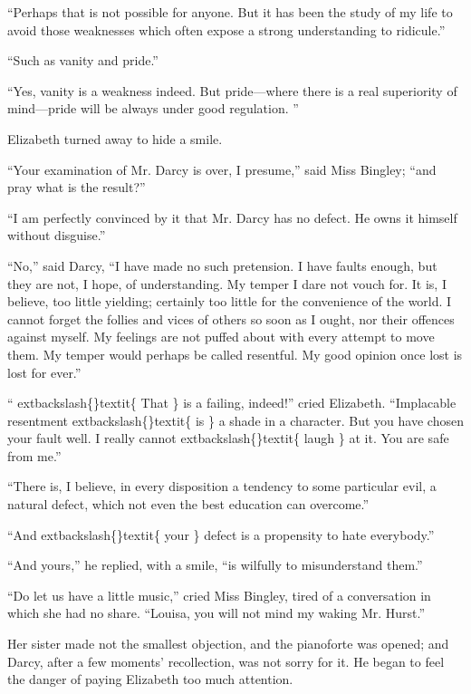 \documentclass[10pt]{book}
\begin{document}
   “Perhaps that is not possible for anyone. But it has been the study of
my life to avoid those weaknesses which often expose a strong
understanding to ridicule.”
  

   “Such as vanity and pride.”
  

   “Yes, vanity is a weakness indeed. But pride—where there is a real
superiority of mind—pride will be always under good regulation.
   ”
  

   Elizabeth turned away to hide a smile.
  

   “Your examination of Mr. Darcy is over, I presume,” said Miss Bingley;
“and pray what is the result?”
  

   “I am perfectly convinced by it that Mr. Darcy has no defect. He owns it
himself without disguise.”
  

   “No,” said Darcy, “I have made no such pretension. I have faults enough,
but they are not, I hope, of understanding. My temper I dare not vouch
for. It is, I believe, too little yielding; certainly too little for the
convenience of the world. I cannot forget the follies and vices of
others so soon as I ought, nor their offences against myself. My
feelings are not puffed about with every attempt to move them. My temper
would perhaps be called resentful. My good opinion once lost is lost for
ever.”
  

   “
   	extbackslash\{\}textit\{
    That
   \}
   is a failing, indeed!” cried Elizabeth. “Implacable resentment
   	extbackslash\{\}textit\{
    is
   \}
   a shade in a character. But you have chosen your fault well. I
really cannot
   	extbackslash\{\}textit\{
    laugh
   \}
   at it. You are safe from me.”
  

   “There is, I believe, in every disposition a tendency to some particular
evil, a natural defect, which not even the best education can overcome.”
  

   “And
   	extbackslash\{\}textit\{
    your
   \}
   defect is a propensity to hate everybody.”
  

   “And yours,” he replied, with a smile, “is wilfully to misunderstand
them.”
  

   “Do let us have a little music,” cried Miss Bingley, tired of a
conversation in which she had no share. “Louisa, you will not mind my
waking Mr. Hurst.”
  

   Her sister made not the smallest objection, and the pianoforte was
opened; and Darcy, after a few moments’ recollection, was not sorry for
it. He began to feel the danger of paying Elizabeth too much attention.
  
\end{document}

